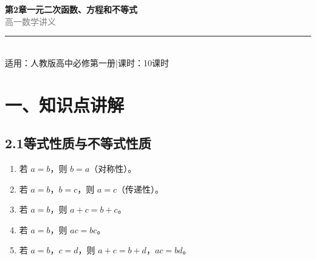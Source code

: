 \documentclass[12pt, a4paper]{ctexart}
\begin{document}
\begin{center}
{\Huge\bfseries\textcolor{mainblue}{第2章\quad 一元二次函数、方程和不等式}}\\[12pt]
{\Large\textcolor{gray}{高一数学讲义}}\\[8pt]
\rule{0.6\textwidth}{1pt}\\[8pt]
{\normalsize 适用：人教版高中必修第一册\quad |\quad 课时：10课时}
\end{center}
\vspace{10pt}

\section*{\textcolor{mainblue}{一、知识点讲解}}

\subsection*{2.1\quad 等式性质与不等式性质}

\begin{knowledgebox}[等式的基本性质]
\begin{enumerate}[leftmargin=2em]
  \item 若 $a = b$，则 $b = a$（对称性）。
  \item 若 $a = b$，$b = c$，则 $a = c$（传递性）。
  \item 若 $a = b$，则 $a + c = b + c$。
  \item 若 $a = b$，则 $ac = bc$。
  \item 若 $a = b$，$c = d$，则 $a + c = b + d$，$ac = bd$。
\end{enumerate}
\end{knowledgebox}
\end{document}
